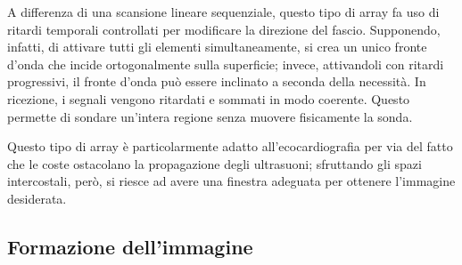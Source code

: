 \documentclass[11pt, a4paper]{scrartcl}
\theoremstyle{style}
\theoremstyle{style1}
\numberwithin{equation}{subsection}
\begin{document}
\begin{itemize}
			A differenza di una scansione lineare sequenziale, questo tipo di array fa uso di ritardi temporali controllati per modificare la direzione del fascio.
			Supponendo, infatti, di attivare tutti gli elementi simultaneamente, si crea un unico fronte d'onda che incide ortogonalmente sulla superficie; invece, attivandoli con ritardi progressivi, il fronte d'onda pu\`o essere inclinato a seconda della necessit\`a.
			In ricezione, i segnali vengono ritardati e sommati in modo coerente.
			Questo permette di sondare un'intera regione senza muovere fisicamente la sonda.
			
			Questo tipo di array \`e particolarmente adatto all'ecocardiografia per via del fatto che le coste ostacolano la propagazione degli ultrasuoni; sfruttando gli spazi intercostali, per\`o, si riesce ad avere una finestra adeguata per ottenere l'immagine desiderata.
\end{itemize}



\subsection{Formazione dell'immagine}
\end{document}
